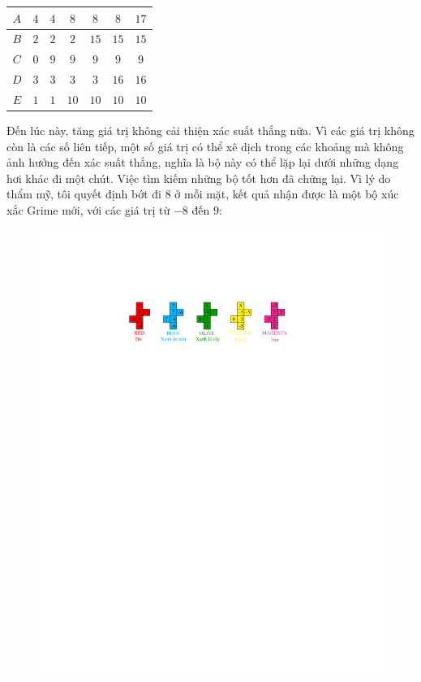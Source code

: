 \begin{multicols}{2}
\begin{table}[H]
\begin{tabular}{|c|c|c|c|c|c|c|}
			\hline
			$A$ &$4$& $4$& $8$& $8$& $8$& $17$\\
			\hline
			$B$ &$2$& $2$& $2$& $15$& $15$& $15$\\
			\hline
			$C$ &$0$& $9$& $9$& $9$& $9$& $9$\\
			\hline
			$D$ &$3$& $3$& $3$& $3$& $16$& $16$\\
			\hline
			$E$ &$1$& $1$& $10$& $10$& $10$& $10$\\
			\hline
		\end{tabular}
		\vspace*{-10pt}
	\end{table}
	Đến lúc này, tăng giá trị không cải thiện xác suất thắng nữa. Vì các giá trị không còn là các số liên tiếp, một số giá trị có thể xê dịch trong các khoảng mà không ảnh hưởng đến xác suất thắng, nghĩa là bộ này có thể lặp lại dưới những dạng hơi khác đi một chút. Việc tìm kiếm những bộ tốt hơn đã chững lại.
	\vskip 0.05cm
	Vì lý do thẩm mỹ, tôi quyết định bớt đi $8$ ở mỗi mặt, kết quả nhận được là một bộ xúc xắc Grime mới, với các giá trị từ $-8$ đến $9$:
	\begin{figure}[H]
		\vspace*{-10pt}
		\centering
		\captionsetup{labelformat= empty, justification=centering}
		\includegraphics[width=1\linewidth]{14}

\end{figure}
\end{multicols}
